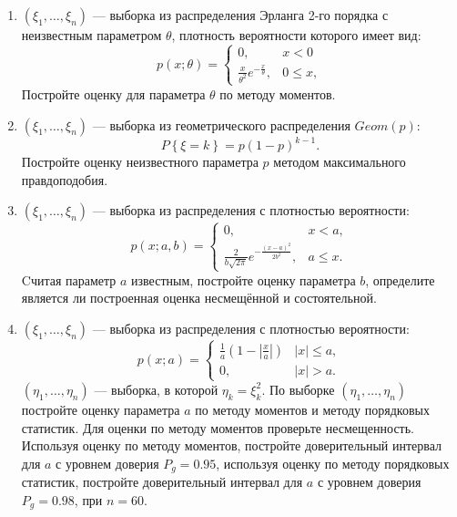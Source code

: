 \documentclass[a4paper,12pt]{article}
\newcommand{\probability}[1]{P \left\{ #1 \right\}}
\newcommand{\modulus}[1]{\left | #1 \right |}
\newcommand{\sample}[2]{\left( #1_1, \dots, #1_{#2} \right)}
\begin{document}
\begin{enumerate}[resume, topsep=1cm, parsep=1cm]
        \item $\sample{\xi}{n}$ --- выборка из распределения Эрланга 2-го порядка с неизвестным параметром $\theta$, плотность
              вероятности которого имеет вид:
              \[
                  p(x; \theta)
                  = \left \{
                  \begin{array}{ll}
                      0,                                        & x < 0    \\
                      \frac{x}{\theta^2} e^{-\frac{x}{\theta}}, & 0 \le x,
                  \end{array}
                  \right .
              \]
              Постройте оценку для параметра $\theta$ по методу моментов.

        \item $\sample{\xi}{n}$ --- выборка из геометрического распределения $Geom(p)$:
              \[
                  \probability{\xi = k} = p (1-p)^{k-1}.
              \]
              Постройте оценку неизвестного параметра $p$ методом максимального правдоподобия.

        \item $\sample{\xi}{n}$ --- выборка из распределения с плотностью вероятности:
              \[
                  p(x; a, b)
                  = \left \{
                  \begin{array}{ll}
                      0,                                                    & x < a,    \\
                      \frac{2}{b \sqrt{2 \pi}} e^{- \frac{(x-a)^2}{2 b^2}}, & a \le x .
                  \end{array}
                  \right .
              \]
              Cчитая параметр $a$ известным, постройте оценку параметра $b$, определите является ли построенная оценка несмещённой и состоятельной.

        \item $\sample{\xi}{n}$ --- выборка из распределения с плотностью вероятности:
              \[
                  p(x; a)
                  = \left \{
                  \begin{array}{ll}
                      \frac{1}{a} \left( 1 - \modulus{\frac{x}{a}} \right) & \modulus{x} \le a , \\
                      0,                                                   & \modulus{x} > a .
                  \end{array}
                  \right .
              \]
              $\sample{\eta}{n}$ --- выборка, в которой $\eta_k = \xi_k^2$.
              По выборке $\sample{\eta}{n}$ постройте оценку параметра $a$ по методу моментов и методу порядковых статистик.
              Для оценки по методу моментов проверьте несмещенность. Используя оценку по методу моментов, постройте доверительный интервал
              для $a$ с уровнем доверия $P_g = 0.95$, используя оценку по методу порядковых статистик, постройте доверительный интервал
              для $a$ с уровнем доверия $P_g = 0.98$, при $n = 60$.


\end{enumerate}
\end{document}
